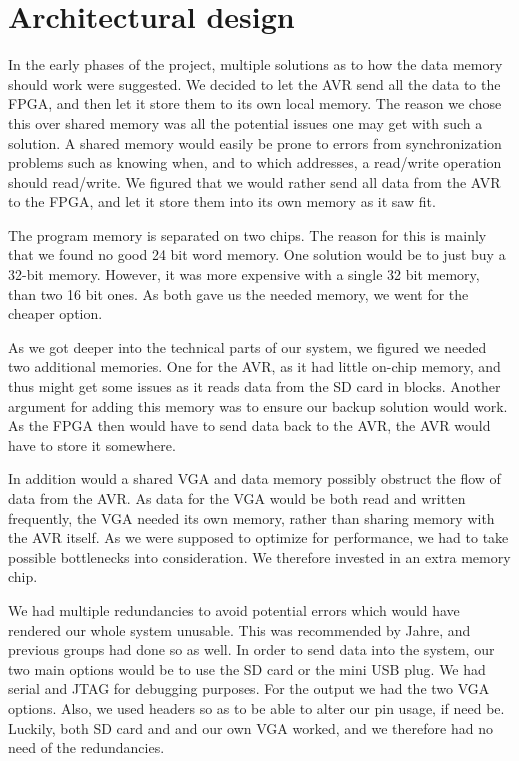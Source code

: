 \section {Architectural design}
 In the early phases of the project,
multiple solutions as to how the data memory should work were suggested. We
decided to let the AVR send all the data to the \ac{FPGA}, and then let it store
them to its own local memory. The reason we chose this over shared memory was
all the potential issues one may get with such a solution. A shared memory would
easily be prone to errors from synchronization problems such as knowing when,
and to which addresses, a read/write operation should read/write. We figured
that we would rather send all data from the AVR to the \ac{FPGA}, and let it
store them into its own memory as it saw fit.

The program memory is
separated on two chips. The reason for this is mainly that we found no good 24
bit word memory. One solution would be to just buy a 32-bit memory. However, it
was more expensive with a single 32 bit memory, than two 16 bit ones. As both
gave us the needed memory, we went for the cheaper option.

 As we got deeper into the technical parts of our
system, we figured we needed two additional memories. One for the AVR, as it had
little on-chip memory, and thus might get some issues as it reads data from the
\ac{SD} card in blocks. Another argument for adding this memory was
to ensure our backup solution would work. As the \ac{FPGA} then would have to
send data back to the AVR, the AVR would have to store it somewhere.

In addition would a shared \ac{VGA} and data memory possibly obstruct the flow
of data from the AVR. As data for the \ac{VGA} would be both read and written
frequently, the \ac{VGA} needed its own memory, rather than sharing memory with
the AVR itself. As we were supposed to optimize for performance, we had to take
possible bottlenecks into consideration. We therefore invested in an extra
memory chip.

 We had multiple redundancies to avoid potential
errors which would have rendered our whole system unusable. This was recommended
by Jahre, and previous groups had done so as well. In order to send data into
the system, our two main options would be to use the \ac{SD} card or the mini
\ac{USB} plug. We had serial and \ac{JTAG} for debugging purposes. For the
output we had the two \ac{VGA} options. Also, we used headers so as to be able
to alter our pin usage, if need be. Luckily, both \ac{SD} card and and our
own \ac{VGA} worked, and we therefore had no need of the
redundancies. 
